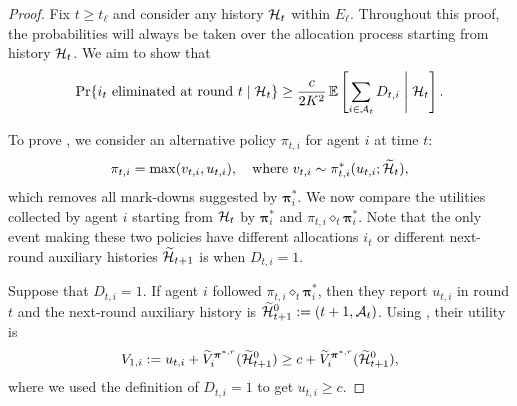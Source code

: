 \begin{proof}
Fix $t\geq t_\ell$ and consider any history $\mathcal{H}_{t}$ within $E_\ell$. Throughout this proof, the probabilities will always be taken over the allocation process starting from history $\mathcal{H}_{t}$. We aim to show that
\begin{equation}\label{eq:lower_bound_proba_die}
    \Pr \{i_t\text{ eliminated at round } t\mid\mH_t \} \geq \frac{c}{2K^2} \E\sqb{\sum_{i\in\mA_t} D_{t,i} \middle \vert \mH_t}.
\end{equation}

To prove , we consider an alternative policy $\pi_{t,i}$ for agent $i$ at time $t$:
\begin{equation*}
\pi_{t,i}=\max(v_{t,i},u_{t,i}),\quad \text{where }v_{t,i}\sim \pi_{t,i}^\ast(u_{t,i};\widetilde {\mathcal{H}}_{t}),
\end{equation*}
which removes all mark-downs suggested by $\bm \pi_i^\ast$. We now compare the utilities collected by agent $i$ starting from $\mathcal{H}_{t}$ by $\bm\pi_i^\ast$ and $\pi_{t,i} \diamond_t \bm\pi_{i}^\ast$. Note that the only event making these two policies have different allocations $i_{t}$ or different next-round auxiliary histories $\widetilde {\mathcal{H}}_{t+1}$ is when $D_{t,i}=1$.

Suppose that $D_{t,i}=1$. If agent $i$ followed $\pi_{t,i} \diamond_t \bm\pi_{i}^\ast$, then they report $u_{t,i}$ in round $t$ and the next-round auxiliary history is $\widetilde{\mathcal{H}}_{t+1}^0:=(t+1,\mathcal{A}_t)$. Using , their utility is
\begin{equation*}
    V_{1,i}:=u_{t,i} + \widetilde V_i^{{\bm \pi}^{\ast,r}}(\widetilde{\mathcal{H}}_{t+1}^0) \geq c + \widetilde V_i^{{\bm \pi}^{\ast,r}}(\widetilde{\mathcal{H}}_{t+1}^0),
\end{equation*}
where we used the definition of $D_{t,i}=1$ to get $u_{t,i}\geq c$.


\end{proof}
